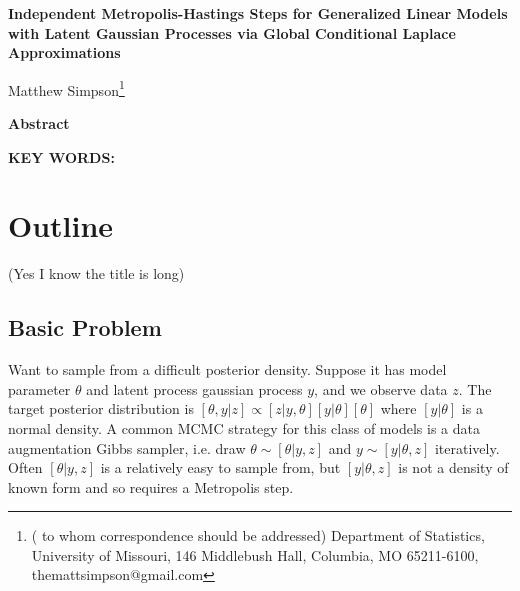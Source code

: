 \documentclass[12pt]{article}
\begin{document}
\thispagestyle{empty} \baselineskip=28pt

\begin{center}
{\LARGE{\bf Independent Metropolis-Hastings Steps for Generalized Linear Models with Latent Gaussian Processes via Global Conditional Laplace Approximations}}
\end{center}

\baselineskip=12pt
\vskip 2mm
\blind
{
  \begin{center}
    Matthew Simpson\footnote{(\baselineskip=10pt to whom correspondence should be addressed)
      Department of Statistics, University of Missouri,
      146 Middlebush Hall, Columbia, MO 65211-6100, themattsimpson@gmail.com}
  \end{center}
} \fi

\vskip 2mm
\begin{center}
{\large{\bf Abstract}}
\end{center}

\baselineskip=12pt

\baselineskip=12pt
\par\vfill\noindent
{\bf KEY WORDS:}

\par\medskip\noindent


\clearpage\pagebreak\newpage {}
\baselineskip=24pt

\section{Outline}
(Yes I know the title is long)
\subsection{Basic Problem}
Want to sample from a difficult posterior density. Suppose it has model parameter $\theta$ and latent process gaussian process $y$, and we observe data $z$. The target posterior distribution is $[\theta, y|z] \propto [z|y,\theta][y|\theta][\theta]$ where $[y|\theta]$ is a normal density. A common MCMC strategy for this class of models is a data augmentation Gibbs sampler, i.e. draw $\theta \sim [\theta|y,z]$ and $y \sim [y|\theta,z]$ iteratively. Often $[\theta|y,z]$ is a relatively easy to sample from, but $[y|\theta,z]$ is not a density of known form and so requires a Metropolis step.
\end{document}
